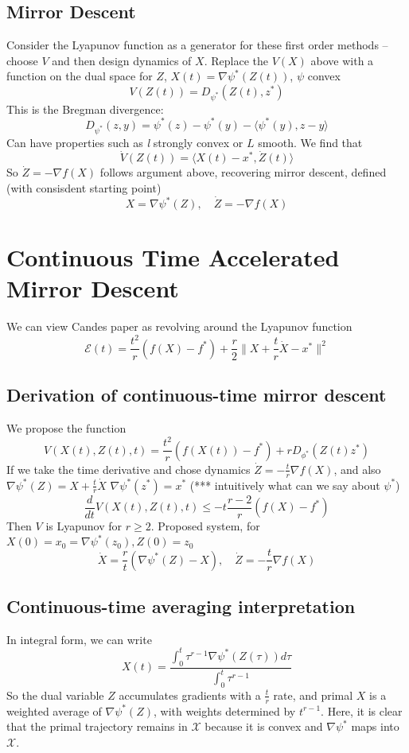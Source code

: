 \subsection{Mirror Descent}
Consider the Lyapunov function as a generator for these first order methods -- choose $V$ and then design dynamics of $X$. Replace the $V(X)$ above with a function on the dual space for $Z$, $X(t) = \nabla\psi^*(Z(t))$, $\psi$ convex
\[V(Z(t)) = D_{\psi^*} (Z(t), z^*)\]
This is the Bregman divergence: 
\[ D_{\psi^*}(z,y) = \psi^*(z) - \psi^*(y) - \langle \psi^*(y), z-y\rangle \]
Can have properties such as \textit{l} strongly convex or $L$ smooth. We find that
\[\dot V(Z(t)) = \langle  X(t) - x^*, \dot Z(t)\rangle\]
So $\dot Z = -\nabla f(X)$ follows argument above, recovering mirror descent, defined (with consisdent starting point)
\[X = \nabla\psi^*(Z), \quad \dot Z = -\nabla f(X)\]

\section{Continuous Time Accelerated Mirror Descent}
We can view Candes paper as revolving around the Lyapunov function 
\[\mathcal{E}(t) = \frac{t^2}{r} (f(X) - f^*) + \frac{r}{2} \|X+\frac{t}{r}\dot X - x^* \|^2\]

\subsection{Derivation of continuous-time mirror descent}
We propose the function
\[ V(X(t),Z(t),t) = \frac{t^2}{r} (f(X(t)) - f^*) + r D_{\phi^*} (Z(t) z^*) \]
If we take the time derivative and chose dynamics $\dot Z = -\frac{t}{r} \nabla f(X)$, and also $\nabla \psi^*(Z) = X + \frac{t}{r} \dot X$ $\nabla \psi^*(z^*) = x^*$ (*** intuitively what can we say about $\psi^*$)
\[ \frac{d}{dt} V(X(t),Z(t),t) \leq -t \frac{r-2}{r} (f(X) - f^*) \]
Then $V$ is Lyapunov for $r\geq 2$. Proposed system, for $X(0) = x_0 = \nabla \psi^*(z_0), Z(0) = z_0$
\[ \dot X = \frac{r}{t} (\nabla \psi^*(Z) - X),\quad \dot Z = -\frac{t}{r} \nabla f(X) \]

\subsection{Continuous-time averaging interpretation}
In integral form, we can write
\[ X(t) = \frac{\int_0^t \tau^{r-1} \nabla\psi^*(Z(\tau)) d\tau}{\int_0^t \tau^{r-1}} \]
So the dual variable $Z$ accumulates gradients with a $\frac{t}{r}$ rate, and primal $X$ is a weighted average of $\nabla\psi^*(Z)$, with weights determined by $t^{r-1}$. Here, it is clear that the primal trajectory remains in $\mathcal X$ because it is convex and $\nabla\psi^*$ maps into $\mathcal X$.

